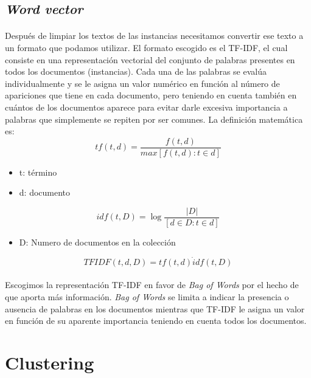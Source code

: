 \documentclass[10pt,a4paper]{article}
\begin{document}
	\subsection{\textit{Word vector}}
	\paragraph{}
	Después de limpiar los textos de las instancias necesitamos convertir ese texto a un formato que podamos utilizar. El formato escogido es el TF-IDF, el cual consiste en una representación vectorial del conjunto de palabras presentes en todos los documentos (instancias). Cada una de las palabras se evalúa individualmente y se le asigna un valor numérico en función al número de apariciones que tiene en cada documento, pero teniendo en cuenta también en cuántos de los documentos aparece para evitar darle excesiva importancia a palabras que simplemente se repiten por ser comunes.
	La definición matemática es: 
		\begin{equation}
	tf(t,d)=\frac{f(t,d)}{max[f(t,d):t \in d]}
	\end{equation}
	\begin{itemize}
	    \item t: término
	    \item d: documento
	\end{itemize}
	\begin{equation}
	idf(t,D)=\log \frac{|D|}{[d \in D : t \in d]}
	\end{equation}
	\begin{itemize}
	    \item D: Numero de documentos en la colección
	\end{itemize}
	\begin{equation}
	TFIDF(t,d,D)=tf(t,d) \dot idf(t,D)
	\end{equation}
	\newline \cite{WikipediaTFIDF}
	\paragraph{}
	Escogimos la representación TF-IDF en favor de \textit{Bag of Words} por el hecho de que aporta más información. \textit{Bag of Words} se limita a indicar la presencia o ausencia de palabras en los documentos mientras que TF-IDF le asigna un valor en función de su aparente importancia teniendo en cuenta todos los documentos.

\section{Clustering}
\end{document}
